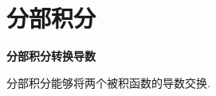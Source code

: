 \documentclass[../../main.tex]{subfiles}%
\begin{document}
\section{分部积分}
\textbf{分部积分转换导数}

分部积分能够将两个被积函数的导数交换.
\end{document}
